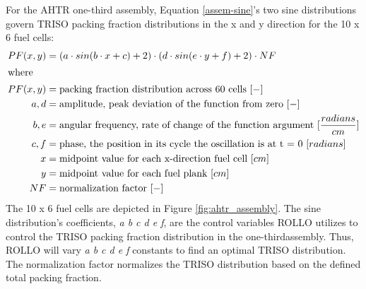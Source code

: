 For the \gls{AHTR} one-third assembly, Equation \ref{assem-sine}'s two sine 
distributions govern \gls{TRISO} packing fraction distributions in the x and y direction 
for the 10 x 6 fuel cells:
\begin{align}
    \label{assem-sine}
    PF(x, y) &= \left(a\cdot sin(b\cdot x + c) + 2\right) 
    \cdot \left(d\cdot sin(e\cdot y + f) + 2\right) \cdot NF \\
    \intertext{where}
    PF(x, y) &= \mbox{packing fraction distribution across 60 cells } [-] \nonumber \\ 
    a, d &= \mbox{amplitude, peak deviation of the function from zero } [-] \nonumber \\
    b, e &= \mbox{angular frequency, rate of change of the function argument } [\frac{radians}{cm}] \nonumber \\
    c, f &= \mbox{phase, the position in its cycle the oscillation is at t = 0 } [radians]\nonumber \\
    x &= \mbox{midpoint value for each x-direction fuel cell } [cm]\nonumber \\
    y &= \mbox{midpoint value for each fuel plank } [cm]\nonumber \\
    NF &= \mbox{normalization factor } [-]\nonumber
\end{align}
The 10 x 6 fuel cells are depicted in Figure \ref{fig:ahtr_assembly}.
The sine distribution's coefficients, \textit{a b c d e f}, are the control variables 
\gls{ROLLO} utilizes to control the TRISO packing fraction distribution in the 
one-thirdassembly.
Thus, \gls{ROLLO} will vary \textit{a b c d e f} constants to find an optimal TRISO 
distribution. 
The normalization factor normalizes the \gls{TRISO} distribution based on the 
defined total packing fraction.

